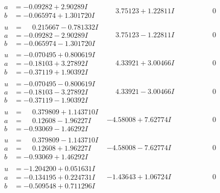 \documentclass[1p]{elsarticle_modified}
\theoremstyle{definition}
\begin{document}
$$\begin{array}{c|c|c}
\begin{aligned}
a &= -0.09282 + 2.90289 I \\
b &= -0.065974 + 1.301720 I\end{aligned}
 & \phantom{-}3.75123 + 1.22811 I & \phantom{-0.000000 } 0 \\ \hline\begin{aligned}
u &= \phantom{-}0.215667 - 0.781332 I \\
a &= -0.09282 - 2.90289 I \\
b &= -0.065974 - 1.301720 I\end{aligned}
 & \phantom{-}3.75123 - 1.22811 I & \phantom{-0.000000 } 0 \\ \hline\begin{aligned}
u &= -0.070495 + 0.800619 I \\
a &= -0.18103 + 3.27892 I \\
b &= -0.37119 + 1.90392 I\end{aligned}
 & \phantom{-}4.33921 + 3.00466 I & \phantom{-0.000000 } 0 \\ \hline\begin{aligned}
u &= -0.070495 - 0.800619 I \\
a &= -0.18103 - 3.27892 I \\
b &= -0.37119 - 1.90392 I\end{aligned}
 & \phantom{-}4.33921 - 3.00466 I & \phantom{-0.000000 } 0 \\ \hline\begin{aligned}
u &= \phantom{-}0.379809 + 1.143710 I \\
a &= \phantom{-}0.12608 - 1.96227 I \\
b &= -0.93069 - 1.46292 I\end{aligned}
 & -4.58008 + 7.62774 I & \phantom{-0.000000 } 0 \\ \hline\begin{aligned}
u &= \phantom{-}0.379809 - 1.143710 I \\
a &= \phantom{-}0.12608 + 1.96227 I \\
b &= -0.93069 + 1.46292 I\end{aligned}
 & -4.58008 - 7.62774 I & \phantom{-0.000000 } 0 \\ \hline\begin{aligned}
u &= -1.204200 + 0.051631 I \\
a &= -0.134195 + 0.224731 I \\
b &= -0.509548 + 0.711296 I\end{aligned}
 & -1.43643 + 1.06724 I & \phantom{-0.000000 } 0 \\ \hline\begin{aligned}

\end{aligned}
\end{array}$$
\end{document}
